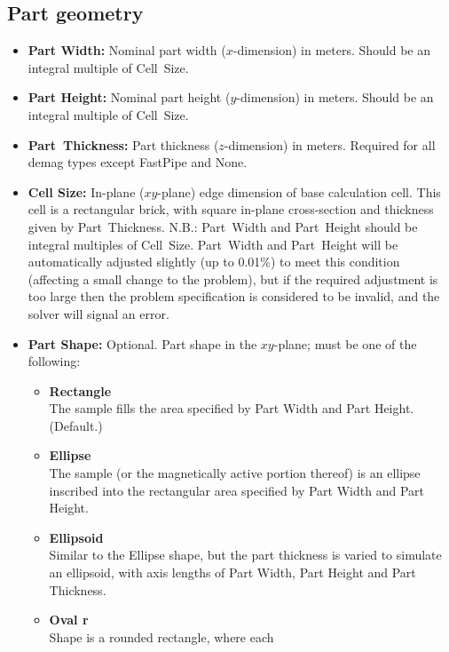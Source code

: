 \subsection{Part geometry}\label{sec:partgeometry}
\begin{itemize}
   \item {\bf Part Width:} Nominal part width ($x$-dimension) in
      meters.  Should be an integral multiple of Cell~Size.
   \item {\bf Part Height:} Nominal part height ($y$-dimension) in
      meters.  Should be an integral multiple of Cell~Size.
   \item {\bf Part~Thickness:} Part thickness ($z$-dimension) in meters.
      Required for all demag types except FastPipe and None.
   \item {\bf Cell Size:} In-plane ($xy$-plane) edge
      dimension of base calculation cell.  This cell is a rectangular
      brick, with square in-plane cross-section and thickness given by
      Part~Thickness.  N.B.: Part~Width and Part~Height should be
      integral multiples of Cell~Size.  Part~Width and Part~Height will
      be automatically adjusted slightly (up to 0.01\%) to meet this
      condition (affecting a small change to the problem), but if the
      required adjustment is too large then the problem specification is
      considered to be invalid, and the solver will signal an error.
   \item {\bf Part Shape:} Optional.  Part shape in the $xy$-plane;
      must be one of the following:
   \begin{itemize}
      \item {\bf Rectangle}\\
         The sample fills the area specified by Part Width and Part
         Height. (Default.)
      \item {\bf Ellipse}\\
         The sample (or the magnetically active
         portion thereof) is an ellipse inscribed into the rectangular
         area specified by Part Width and Part Height.
      \item {\bf Ellipsoid}\\
         Similar to the Ellipse shape, but the part thickness is
         varied to simulate an ellipsoid, with axis lengths of
         Part Width, Part Height and Part Thickness.
      \item {\bf Oval r}\\
         Shape is a rounded rectangle, where each

\end{itemize}
\end{itemize}
